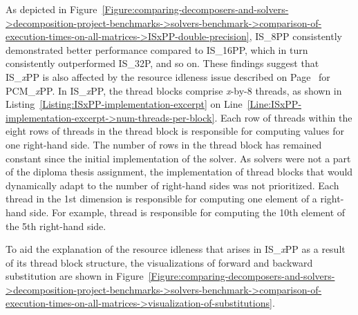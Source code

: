 As depicted in Figure~\ref{Figure:comparing-decomposers-and-solvers->decomposition-project-benchmarks->solvers-benchmark->comparison-of-execution-times-on-all-matrices->ISxPP-double-precision}, IS\_8PP consistently demonstrated better performance compared to IS\_16PP, which in turn consistently outperformed IS\_32P, and so on.
These findings suggest that IS\_\textit{x}PP is also affected by the resource idleness issue described on Page~\pageref{Paragraph:comparing-decomposers-and-solvers->decomposition-project-benchmarks->decomposers-benchmark->comparison-of-execution-times-on-subset-of-matrices->PCMxPP} for PCM\_\textit{x}PP.
In IS\_\textit{x}PP, the thread blocks comprise \textit{x}-by-8 threads, as shown in Listing~\ref{Listing:ISxPP-implementation-excerpt} on Line~\ref{Line:ISxPP-implementation-excerpt->num-threads-per-block}.
Each row of threads within the eight rows of threads in the thread block is responsible for computing values for one right-hand side.
The number of rows in the thread block has remained constant since the initial implementation of the solver.
As solvers were not a part of the diploma thesis assignment, the implementation of thread blocks that would dynamically adapt to the number of right-hand sides was not prioritized.
Each thread in the 1st dimension is responsible for computing one element of a right-hand side.
For example, thread  is responsible for computing the 10th element of the 5th right-hand side.

To aid the explanation of the resource idleness that arises in IS\_\textit{x}PP as a result of its thread block structure, the visualizations of forward and backward substitution are shown in Figure~\ref{Figure:comparing-decomposers-and-solvers->decomposition-project-benchmarks->solvers-benchmark->comparison-of-execution-times-on-all-matrices->visualization-of-substitutions}.

